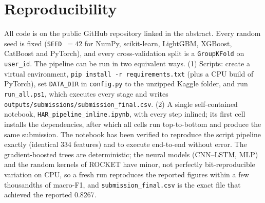 \documentclass[conference]{IEEEtran}
\begin{document}
\section{Reproducibility}
All code is on the public GitHub repository linked in the abstract. Every random seed
is fixed (\texttt{SEED}~$=42$ for NumPy, scikit-learn, LightGBM, XGBoost, CatBoost and
PyTorch), and every cross-validation split is a \texttt{GroupKFold} on
\texttt{user\_id}. The pipeline can be run in two equivalent ways. (1) Scripts: create
a virtual environment, \texttt{pip install -r requirements.txt} (plus a CPU build of
PyTorch), set \texttt{DATA\_DIR} in \texttt{config.py} to the unzipped Kaggle folder,
and run \texttt{run\_all.ps1}, which executes every stage and writes
\texttt{outputs/submissions/submission\_final.csv}. (2) A single self-contained
notebook, \texttt{HAR\_pipeline\_inline.ipynb}, with every step inlined; its first
cell installs the dependencies, after which all cells run top-to-bottom and produce
the same submission. The notebook has been verified to reproduce the script pipeline exactly (identical 334 features) and to execute end-to-end without error. The gradient-boosted trees are deterministic; the neural models (CNN--LSTM, MLP) and the random kernels of ROCKET have minor, not perfectly bit-reproducible variation on CPU, so a fresh run reproduces the reported figures within a few thousandths of macro-F1, and \texttt{submission\_final.csv} is the exact file that achieved the reported 0.8267.



\end{document}
